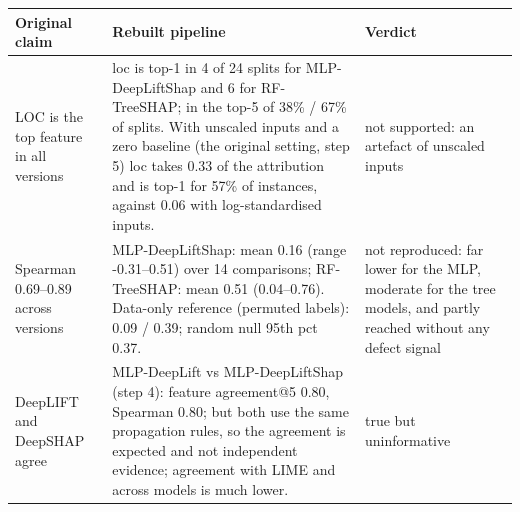 \small
\begin{tabular}{p{3.2cm}p{9.5cm}p{3.2cm}}
\toprule
Original claim & Rebuilt pipeline & Verdict \\
\midrule
LOC is the top feature in all versions & loc is top-1 in 4 of 24 splits for MLP-DeepLiftShap and 6 for RF-TreeSHAP; in the top-5 of 38\% / 67\% of splits. With unscaled inputs and a zero baseline (the original setting, step 5) loc takes 0.33 of the attribution and is top-1 for 57\% of instances, against 0.06 with log-standardised inputs. & not supported: an artefact of unscaled inputs \\
Spearman 0.69--0.89 across versions & MLP-DeepLiftShap: mean 0.16 (range -0.31--0.51) over 14 comparisons; RF-TreeSHAP: mean 0.51 (0.04--0.76). Data-only reference (permuted labels): 0.09 / 0.39; random null 95th pct 0.37. & not reproduced: far lower for the MLP, moderate for the tree models, and partly reached without any defect signal \\
DeepLIFT and DeepSHAP agree & MLP-DeepLift vs MLP-DeepLiftShap (step 4): feature agreement@5 0.80, Spearman 0.80; but both use the same propagation rules, so the agreement is expected and not independent evidence; agreement with LIME and across models is much lower. & true but uninformative \\
\bottomrule
\end{tabular}
